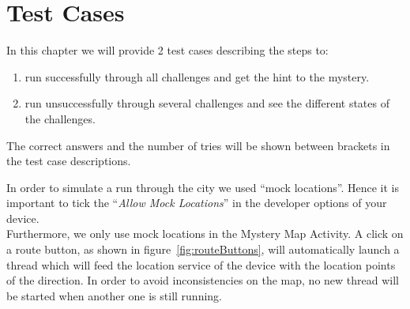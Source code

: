 \chapter{Test Cases}

In this chapter we will provide 2 test cases describing the steps to:
\begin{enumerate}
	\item run successfully through all challenges and get the hint to the mystery.
	\item run unsuccessfully through several challenges and see the different states of the challenges.
\end{enumerate}
The correct answers and the number of tries will be shown between brackets in the test case descriptions.

In order to simulate a run through the city we used ``mock locations''. Hence it is important to tick the ``\emph{Allow Mock Locations}'' in the developer options of your device.\\
Furthermore, we only use mock locations in the Mystery Map Activity. A click on a route button, as shown in figure~\ref{fig:routeButtons}, will automatically launch a thread which will feed the location service of the device with the location points of the direction. In order to avoid inconsistencies on the map, no new thread will be started when another one is still running.

